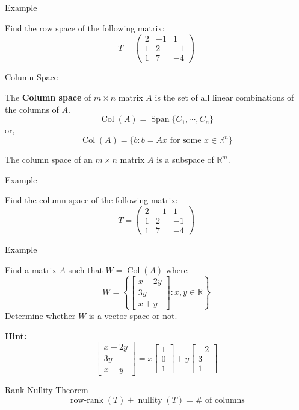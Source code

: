 \documentclass[11pt]{beamer}
\theoremstyle{plain}
\begin{document}
\begin{frame}{Example}
    \begin{example}
        Find the row space of the following matrix:
        $$
        T=\begin{pmatrix}
            2&-1&1\\1&2&-1\\1&7&-4
        \end{pmatrix}
        $$
    \end{example}
\end{frame}



\begin{frame}{Column Space}
    \begin{definition}
        The \textbf{Column space} of $m\times n$ matrix $A$ is the set of all linear combinations of the columns of $A$. 
        $$\operatorname{Col}(A)=\operatorname{Span}\{C_1,\cdots, C_n\}$$
        or, 
        $$\operatorname{Col}(A)=\{b:b=Ax\text{ for some }x\in\mathbb R^n\}$$
    \end{definition}
    The column space of an $m\times n$ matrix $A$ is a subspace of $\mathbb R^m$. 
\end{frame}


\begin{frame}{Example}
    \begin{example}
        Find the column space of the following matrix:
        $$
        T=\begin{pmatrix}
            2&-1&1\\1&2&-1\\1&7&-4
        \end{pmatrix}
        $$
    \end{example}
\end{frame}



\begin{frame}{Example}
\begin{example}
    Find a matrix $A$ such that $W=\operatorname{Col}(A)$ where 
    $$W=\left\{
    \begin{bmatrix}
        x-2y\\3y\\x+y
    \end{bmatrix}:x,y\in\mathbb R
    \right\}$$
Determine whether $W$ is a vector space or not. 
\end{example}
    \textbf{Hint:}
    $$
    \begin{bmatrix}
        x-2y\\3y\\x+y
    \end{bmatrix}=x\begin{bmatrix}
        1\\0\\1
    \end{bmatrix}+y\begin{bmatrix}
        -2\\3\\1
    \end{bmatrix}
    $$
\end{frame}


\begin{frame}{Rank-Nullity Theorem}
    $$
    \operatorname{row-rank}(T)+\operatorname{nullity}(T)=\# \text{ of columns}
    $$
\end{frame}
\end{document}
